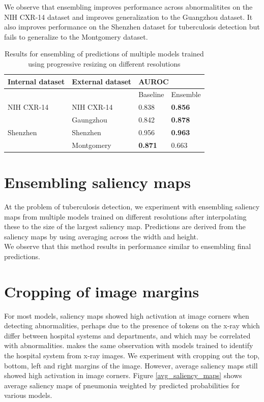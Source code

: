 \documentclass[12pt,oneside,a4paper]{report}
\begin{document}
We observe that ensembling improves performance across abnormalitites on the NIH
CXR-14 dataset and improves generalization to the Guangzhou dataset. It also
improves performance on the Shenzhen dataset for tuberculosis detection but
fails to generalize to the Montgomery dataset.
\begin{table}[]
  \centering
  \begin{tabular}{llll}
    \hline
    \textbf{Internal dataset} & \textbf{External dataset} & \multicolumn{2}{l}{\textbf{AUROC}} \\ \hline
                              &                           & Baseline         & Ensemble        \\ \hline
    NIH CXR-14                & NIH CXR-14                & 0.838            & \textbf{0.856}  \\ \hline
                              & Gaungzhou                 & 0.842            & \textbf{0.878}  \\ \hline
    Shenzhen                  & Shenzhen                  & 0.956            & \textbf{0.963}  \\ \hline
                              & Montgomery                & \textbf{0.871}   & 0.663           \\ \hline
  \end{tabular}
  \caption{Results for ensembling of predictions of multiple models trained
    using progressive resizing on different resolutions}
  \label{tab:ensembling}
\end{table}
\section{Ensembling saliency maps}
At the problem of tuberculosis detection, we experiment with ensembling saliency
maps from multiple models trained on different resolutions after interpolating
these to the size of the largest saliency map. Predictions are derived from the
saliency maps by using averaging across the width and height.\\

We observe that this method results in performance similar to ensembling final
predictions.

\section{Cropping of image margins}
For most models, saliency maps showed high activation at image corners when
detecting abnormalities, perhaps due to the presence of tokens on the x-ray
which differ between hospital systems and departments, and which may be
correlated with abnormalities. \cite{Zech2018} makes the same observation with
models trained to identify the hospital system from x-ray images. We experiment
with cropping out the top, bottom, left and right margins of the image. However,
average saliency maps still showed high activation in image corners. Figure
\ref{avg_saliency_maps} shows average saliency maps of pneumonia weighted by
predicted
probabilities for various models.\\
\end{document}
